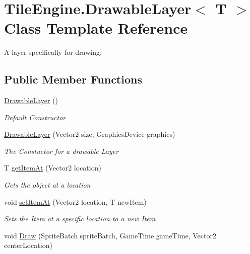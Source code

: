 \hypertarget{class_tile_engine_1_1_drawable_layer_3_01_t_01_4}{\section{Tile\-Engine.\-Drawable\-Layer$<$ T $>$ Class Template Reference}
\label{d5/d15/class_tile_engine_1_1_drawable_layer_3_01_t_01_4}
}


A layer specifically for drawing.  


\subsection*{Public Member Functions}
\begin{DoxyCompactItemize}
\item 
\hyperlink{class_tile_engine_1_1_drawable_layer_3_01_t_01_4_a75c68a1120810d78da78deb7e1842d6d}{Drawable\-Layer} ()
\begin{DoxyCompactList}\small\item\em Default Constructor \end{DoxyCompactList}\item 
\hyperlink{class_tile_engine_1_1_drawable_layer_3_01_t_01_4_afc8431acf52a3ccf8f0ba47688a26249}{Drawable\-Layer} (Vector2 size, Graphics\-Device graphics)
\begin{DoxyCompactList}\small\item\em The Constuctor for a drawable Layer \end{DoxyCompactList}\item 
T \hyperlink{class_tile_engine_1_1_drawable_layer_3_01_t_01_4_af6de54987654c082316ef350f02af005}{get\-Item\-At} (Vector2 location)
\begin{DoxyCompactList}\small\item\em Gets the object at a location \end{DoxyCompactList}\item 
void \hyperlink{class_tile_engine_1_1_drawable_layer_3_01_t_01_4_a9743f584942c1445ab21fe4ae131c94e}{set\-Item\-At} (Vector2 location, T new\-Item)
\begin{DoxyCompactList}\small\item\em Sets the Item at a specific location to a new Item \end{DoxyCompactList}\item 
void \hyperlink{class_tile_engine_1_1_drawable_layer_3_01_t_01_4_a4c1c5d0a76e1b61955e13196efe28e30}{Draw} (Sprite\-Batch sprite\-Batch, Game\-Time game\-Time, Vector2 center\-Location)

\end{DoxyCompactItemize}
